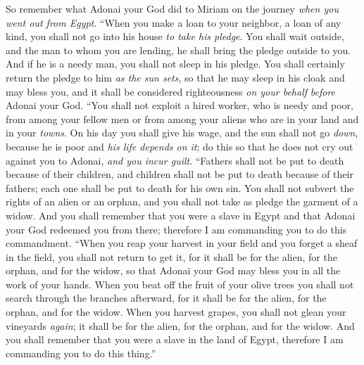 \begin{biblechapter}
\verse So remember what Adonai your God did to Miriam on the journey \textit{when you went out from Egypt}.
\verse “When you make a loan to your neighbor, a loan of any kind, you shall not go into his house \textit{to take his pledge}.
\verse You shall wait outside, and the man to whom you are lending, he shall bring the pledge outside to you.
\verse And if he is a needy man, you shall not sleep in his pledge.
\verse You shall certainly return the pledge to him \textit{as the sun sets}, so that he may sleep in his cloak and may bless you, and it shall be considered righteousness \textit{on your behalf} \textit{before} Adonai your God.
\verse “You shall not exploit a hired worker, who is needy and poor, from among your fellow men or from among your aliens who are in your land and in your \textit{towns}.
\verse On his day you shall give his wage, and the sun shall not go \textit{down}, because he is poor and \textit{his life depends on it}; do this so that he does not cry out against you to Adonai, \textit{and you incur guilt}.
\verse “Fathers shall not be put to death because of their children, and children shall not be put to death because of their fathers; each one shall be put to death for his own sin.
\verse You shall not subvert the rights of an alien or an orphan, and you shall not take as pledge the garment of a widow.
\verse And you shall remember that you were a slave in Egypt and that Adonai your God redeemed you from there; therefore I am commanding you to do this commandment.
\verse “When you reap your harvest in your field and you forget a sheaf in the field, you shall not return to get it, for it shall be for the alien, for the orphan, and for the widow, so that Adonai your God may bless you in all the work of your hands.
\verse When you beat off the fruit of your olive trees you shall not search through the branches afterward, for it shall be for the alien, for the orphan, and for the widow.
\verse When you harvest grapes, you shall not glean your vineyards \textit{again}; it shall be for the alien, for the orphan, and for the widow.
\verse And you shall remember that you were a slave in the land of Egypt, therefore I am commanding you to do this thing.”
\end{biblechapter}


